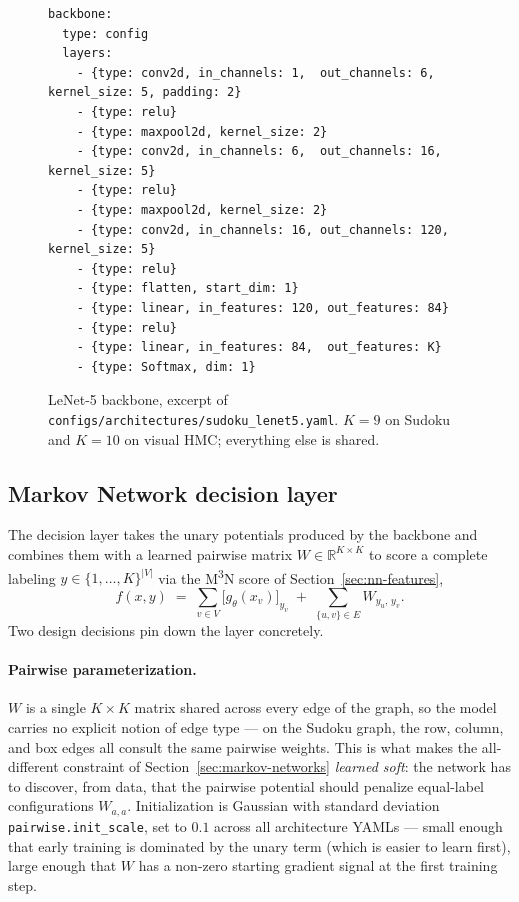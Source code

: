 \begin{figure}[htbp]
\begin{verbatim}
backbone:
  type: config
  layers:
    - {type: conv2d, in_channels: 1,  out_channels: 6,   kernel_size: 5, padding: 2}
    - {type: relu}
    - {type: maxpool2d, kernel_size: 2}
    - {type: conv2d, in_channels: 6,  out_channels: 16,  kernel_size: 5}
    - {type: relu}
    - {type: maxpool2d, kernel_size: 2}
    - {type: conv2d, in_channels: 16, out_channels: 120, kernel_size: 5}
    - {type: relu}
    - {type: flatten, start_dim: 1}
    - {type: linear, in_features: 120, out_features: 84}
    - {type: relu}
    - {type: linear, in_features: 84,  out_features: K}
    - {type: Softmax, dim: 1}
\end{verbatim}
\caption[LeNet-5 backbone YAML]{LeNet-5 backbone, excerpt of
\texttt{configs/architectures/sudoku\_lenet5.yaml}. $K = 9$ on
Sudoku and $K = 10$ on visual HMC; everything else is shared.}
\label{fig:method-lenet5-yaml}
\end{figure}

\subsection{Markov Network decision layer}
\label{subsec:method-architecture-mn}

The decision layer takes the unary potentials produced by the
backbone and combines them with a learned pairwise matrix
$W \in \mathbb{R}^{K \times K}$ to score a complete labeling
$y \in \{1, \ldots, K\}^{|V|}$ via the M\textsuperscript{3}N
score of Section~\ref{sec:nn-features},
\begin{equation}
    f(x, y) \;=\; \sum_{v \in V}
    \bigl[ g_\theta(x_v) \bigr]_{y_v}
    \;+\; \sum_{\{u, v\} \in E} W_{y_u,\, y_v}.
    \label{eq:method-mn-score}
\end{equation}
Two design decisions pin down the layer concretely.

\paragraph{Pairwise parameterization.}
$W$ is a single $K \times K$ matrix shared across every edge
of the graph, so the model carries no explicit notion of edge
type --- on the Sudoku graph, the row, column, and box edges
all consult the same pairwise weights. This is what makes the
all-different constraint of
Section~\ref{sec:markov-networks} \emph{learned soft}: the
network has to discover, from data, that the pairwise potential
should penalize equal-label configurations $W_{a, a}$.
Initialization is Gaussian with standard deviation
\texttt{pairwise.init\_scale}, set to $0.1$ across all
architecture YAMLs --- small enough that early training is
dominated by the unary term (which is easier to learn first),
large enough that $W$ has a non-zero starting gradient signal
at the first training step.

